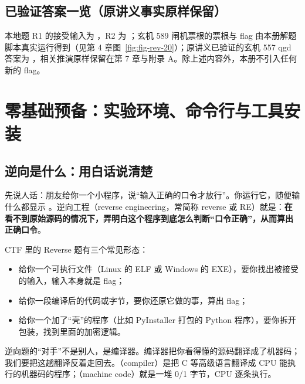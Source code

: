 \documentclass[UTF8,12pt,oneside]{ctexbook}
\begin{document}
\section*{已验证答案一览（原讲义事实原样保留）}
本地题 R1 的接受输入为 ，R2 为 ；玄机 589 闸机票根的票根与 flag 由本册解题脚本真实运行得到（见第 4 章图~\ref{fig:fig-rev-20}）；原讲义已验证的玄机 557 qgd 答案为 ，相关推演原样保留在第 7 章与附录 A。除上述内容外，本册不引入任何新的 flag。

\tableofcontents
\mainmatter

\chapter{零基础预备：实验环境、命令行与工具安装}

\section{逆向是什么：用白话说清楚}
先说人话：朋友给你一个小程序，说“输入正确的口令才放行”。你运行它，随便输什么都显示 。逆向工程（reverse engineering，常简称 reverse 或 RE）就是：\textbf{在看不到原始源码的情况下，弄明白这个程序到底怎么判断“口令正确”，从而算出正确口令}。

CTF 里的 Reverse 题有三个常见形态：
\begin{itemize}
\item 给你一个可执行文件（Linux 的 ELF 或 Windows 的 EXE），要你找出被接受的输入，输入本身就是 flag；
\item 给你一段编译后的代码或字节，要你还原它做的事，算出 flag；
\item 给你一个加了“壳”的程序（比如 PyInstaller 打包的 Python 程序），要你拆开包装，找到里面的加密逻辑。
\end{itemize}

逆向题的“对手”不是别人，是编译器。编译器把你看得懂的源码翻译成了机器码；我们要把这趟翻译反着走回去。（compiler）是把 C 等高级语言翻译成 CPU 能执行的机器码的程序；（machine code）就是一堆 0/1 字节，CPU 逐条执行。

\end{document}
